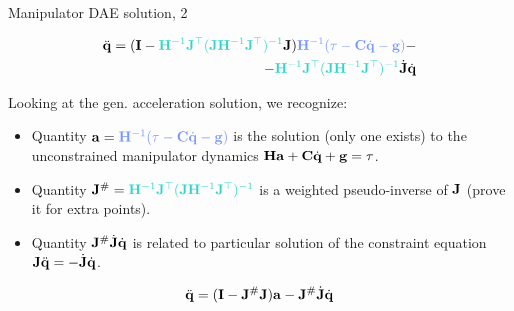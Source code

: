 \documentclass{beamer}
\begin{document}
\begin{frame}{Manipulator DAE solution, 2}
	\begin{flushleft}
		
		\textcolor{mygrey}{
		\begin{align*}
			\ddot{\bo{q}}
			=
			(\bo{I}-\textcolor{myturquoise}{\bo{H}^{-1} \bo{J}\T ( \bo{J} \bo{H}^{-1} \bo{J}\T )^{-1}} \bo{J})
			 \textcolor{mylightblue}{\bo{H}^{-1}(\tau - \bo{C} \dot{\bo{q}} - \bo{g})} 
			-\\
			-
			\textcolor{myturquoise}{\bo{H}^{-1} \bo{J}\T ( \bo{J} \bo{H}^{-1} \bo{J}\T )^{-1}} \dot{\bo{J}} \dot{\bo{q}}
		\end{align*}
	}
		
		Looking at the gen. acceleration solution, we recognize:
		
		\begin{itemize}
			\item Quantity $\bo{a} = \textcolor{mylightblue}{\bo{H}^{-1}(\tau - \bo{C} \dot{\bo{q}} - \bo{g})}$ is the solution (only one exists) to the unconstrained manipulator dynamics $\mathbf{H}\mathbf{a} + \mathbf{C} \dot{\mathbf{q}} + \mathbf{g} = \tau$.
			
			\item Quantity $\bo{J}^\# = \textcolor{myturquoise}{\bo{H}^{-1} \bo{J}\T ( \bo{J} \bo{H}^{-1} \bo{J}\T )^{-1}}$ is a weighted pseudo-inverse of $\mathbf{J}$ \textcolor{mygrey}{\small{(prove it for extra points)}}.
			
			\item Quantity $\mathbf{J}^\# \dot{\mathbf{J}} \dot{\mathbf{q}}$ is related to particular solution of the constraint equation $\mathbf{J} \ddot{\mathbf{q}} = - \dot{\mathbf{J}} \dot{\mathbf{q}}$.
		\end{itemize}
		
		
		\textcolor{mygrey}{
			\begin{align}
				\ddot{\mathbf{q}}
				=
				(\mathbf{I}-\mathbf{J}^\# \mathbf{J})
				\mathbf{a}
				-
				\mathbf{J}^\# \dot{\mathbf{J}} \dot{\mathbf{q}}
			\end{align}
		}
		
	\end{flushleft}
\end{frame}
\end{document}
